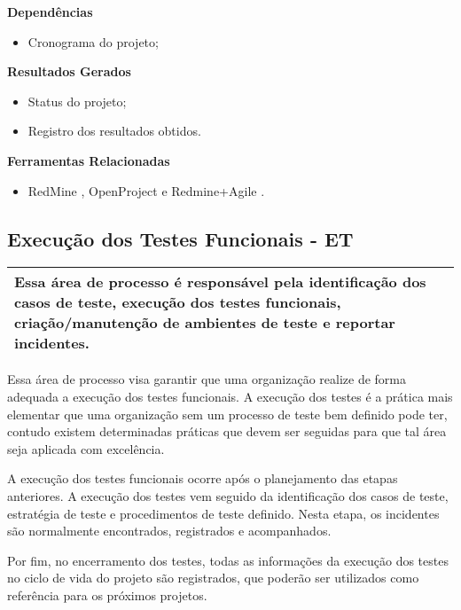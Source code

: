 \textbf{Dependências}
\begin{itemize}
    \item Cronograma do projeto;
\end{itemize}

\textbf{Resultados Gerados}
\begin{itemize}
    \item  Status do projeto;
    \item  Registro dos resultados obtidos.
\end{itemize}

\textbf{Ferramentas Relacionadas}
\begin{itemize}
    \item RedMine \cite{Redmine}, OpenProject \cite{OpenProject} e Redmine+Agile \cite{RedmineUP}.
\end{itemize}

\subsection{Execução dos Testes Funcionais - ET}
\label{sec:et0}

\begin{table}[H]
\centering
\begin{tabular}{|p{130mm}|}
\hline
Essa área de processo é responsável pela identificação dos casos de teste, execução dos testes funcionais, criação/manutenção de ambientes de teste e reportar incidentes. \\ 
\hline
\end{tabular}
\end{table}

Essa área de processo visa garantir que uma organização realize de forma adequada a execução dos testes funcionais. A execução dos testes é a prática mais elementar que uma organização sem um processo de teste bem definido pode ter, contudo existem determinadas práticas que devem ser seguidas para que tal área seja aplicada com excelência.

A execução dos testes funcionais ocorre após o planejamento das etapas anteriores. A execução dos testes vem seguido da identificação dos casos de teste, estratégia de teste e procedimentos de teste definido. Nesta etapa, os incidentes são normalmente encontrados, registrados e acompanhados.

Por fim, no encerramento dos testes, todas as informações da execução dos testes no ciclo de vida do projeto são registrados, que poderão ser utilizados como referência para os próximos projetos.

